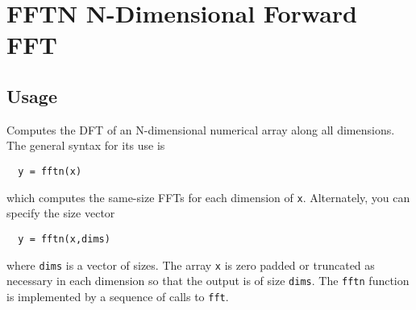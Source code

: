 \section{FFTN N-Dimensional Forward FFT }

\subsection{Usage}

Computes the DFT of an N-dimensional numerical array along all
dimensions.  The general syntax for its use is
\begin{verbatim}
  y = fftn(x)
\end{verbatim}
which computes the same-size FFTs for each dimension of \verb|x|.
Alternately, you can specify the size vector
\begin{verbatim}
  y = fftn(x,dims)
\end{verbatim}
where \verb|dims| is a vector of sizes.  The array \verb|x| is zero padded
or truncated as necessary in each dimension so that the output
is of size \verb|dims|. The \verb|fftn| function is implemented by a sequence
of calls to \verb|fft|.
